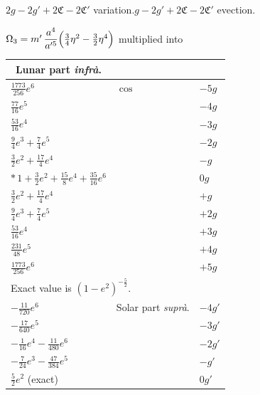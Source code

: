 \documentclass[11pt]{article}
\begin{document}
\noindent\hfill $2g-2g'+2\mathfrak{C}-2\mathfrak{C}'$ variation.\quad $g-2g'+2\mathfrak{C}-2\mathfrak{C}'$ evection.

\bigskip
{} $\Omega_{3} = m'\,\dfrac{a^{4}}{a'^{5}}\Bigl(\tfrac{3}{4}\eta^{2}-\tfrac{3}{2}\eta^{4}\Bigr)$ multiplied into

\begin{center}
\begin{tabular}{|l|l|l|}
\hline
\multicolumn{1}{|c|}{Lunar part \textit{infr\`a}.} & & \\
\hline
$\tfrac{1773}{256}e^{6}$                           & $\cos$ & $-5g$ \\
$\tfrac{77}{16}e^{5}$                              &        & $-4g$ \\
$\tfrac{53}{16}e^{4}$                              &        & $-3g$ \\
$\tfrac{9}{4}e^{3}+\tfrac{7}{4}e^{5}$              &        & $-2g$ \\
$\tfrac{3}{2}e^{2}+\tfrac{17}{4}e^{4}$             &        & $-g$ \\
$*\,1+\tfrac{3}{2}e^{2}+\tfrac{15}{8}e^{4}+\tfrac{35}{16}e^{6}$ &  & $0g$ \\
$\tfrac{3}{2}e^{2}+\tfrac{17}{4}e^{4}$             &        & $+g$ \\
$\tfrac{9}{4}e^{3}+\tfrac{7}{4}e^{5}$              &        & $+2g$ \\
$\tfrac{53}{16}e^{4}$                              &        & $+3g$ \\
$\tfrac{231}{48}e^{5}$                             &        & $+4g$ \\
$\tfrac{1773}{256}e^{6}$                           &        & $+5g$ \\
\hline
\multicolumn{3}{|l|}{\small * Exact value is $(1-e^{2})^{-\tfrac{5}{2}}$.} \\
\hline
$-\tfrac{11}{720}e^{6}$                                 & Solar part \textit{supr\`a}. & $-4g'$ \\
$-\tfrac{17}{640}e^{5}$                                 &                              & $-3g'$ \\
$-\tfrac{1}{16}e^{4}-\tfrac{11}{480}e^{6}$              &                              & $-2g'$ \\
$-\tfrac{7}{24}e^{3}-\tfrac{47}{384}e^{5}$              &                              & $-g'$ \\
$\tfrac{5}{2}e^{2}$ (exact)                             &                              & $0g'$ \\

\end{tabular}
\end{center}
\end{document}
